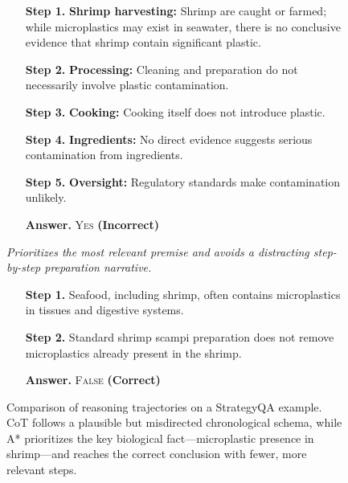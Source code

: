 \documentclass[11pt]{article}
\begin{document}
\begin{figure}[t]
\begin{tcolorbox}
\begin{minipage}[t]{0.485\textwidth}
\begin{tcolorbox}
\vspace{2pt}
\begin{itemize}
    \setlength{\itemsep}{2pt}
    \setlength{\parskip}{0pt}
    \item[\textbf{Step 1.}] \textbf{Shrimp harvesting:} Shrimp are caught or farmed; while microplastics may exist in seawater, there is no conclusive evidence that shrimp contain significant plastic.
    \item[\textbf{Step 2.}] \textbf{Processing:} Cleaning and preparation do not necessarily involve plastic contamination.
    \item[\textbf{Step 3.}] \textbf{Cooking:} Cooking itself does not introduce plastic.
    \item[\textbf{Step 4.}] \textbf{Ingredients:} No direct evidence suggests serious contamination from ingredients.
    \item[\textbf{Step 5.}] \textbf{Oversight:} Regulatory standards make contamination unlikely.
    \item[\textbf{Answer.}] \textsc{Yes} \hfill \textbf{(Incorrect)}
\end{itemize}
\end{tcolorbox}
\end{minipage}
\hfill
\begin{minipage}[t]{0.485\textwidth}
\begin{tcolorbox}[
    enhanced,
    colback=blue!2,
    colframe=blue!65!black,
    boxrule=0.5pt,
    arc=1.2mm,
    left=5pt, right=5pt, top=4pt, bottom=4pt,
    title=\textbf{\color{blue!75!black}\ding{51} A* Search}\hfill \emph{Heuristic-guided},
    colbacktitle=blue!6,
    coltitle=black,
    fonttitle=\footnotesize
]
\textit{Prioritizes the most relevant premise and avoids a distracting step-by-step preparation narrative.}

\vspace{2pt}
\begin{itemize}
    \setlength{\itemsep}{2pt}
    \setlength{\parskip}{0pt}
    \item[\textbf{Step 1.}] Seafood, including shrimp, often contains microplastics in tissues and digestive systems.
    \item[\textbf{Step 2.}] Standard shrimp scampi preparation does not remove microplastics already present in the shrimp.
    \item[\textbf{Answer.}] \textsc{False} \hfill \textbf{(Correct)}
\end{itemize}
\end{tcolorbox}
\end{minipage}

\end{tcolorbox}

\vspace{-2mm}
\caption{Comparison of reasoning trajectories on a StrategyQA example. CoT follows a plausible but misdirected chronological schema, while A* prioritizes the key biological fact—microplastic presence in shrimp—and reaches the correct conclusion with fewer, more relevant steps.}
\label{fig:motivating_example}
\end{figure}
\end{document}
